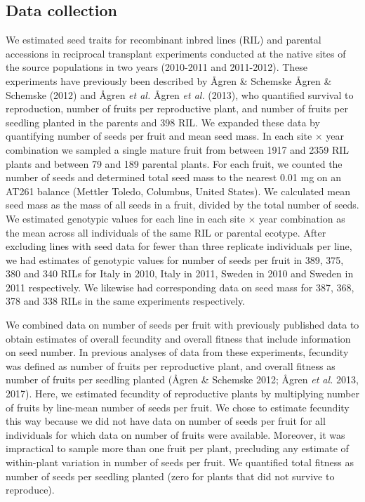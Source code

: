 \documentclass[12pt,]{article}
\begin{document}
\hypertarget{data-collection}{%
\subsection{Data collection}\label{data-collection}}

We estimated seed traits for recombinant inbred lines (RIL) and parental accessions in reciprocal transplant experiments conducted at the native sites of the source populations in two years (2010-2011 and 2011-2012). These experiments have previously been described by Ågren \& Schemske Ågren \& Schemske (2012) and Ågren \emph{et al.} Ågren \emph{et al.} (2013), who quantified survival to reproduction, number of fruits per reproductive plant, and number of fruits per seedling planted in the parents and 398 RIL. We expanded these data by quantifying number of seeds per fruit and mean seed mass. In each site × year combination we sampled a single mature fruit from between 1917 and 2359 RIL plants and between 79 and 189 parental plants.
For each fruit, we counted the number of seeds and determined total seed mass to the nearest 0.01 mg on an AT261 balance (Mettler Toledo, Columbus, United States). We calculated mean seed mass as the mass of all seeds in a fruit, divided by the total number of seeds. We estimated genotypic values for each line in each site × year combination as the mean across all individuals of the same RIL or parental ecotype. After excluding lines with seed data for fewer than three replicate individuals per line, we had estimates of genotypic values for number of seeds per fruit in 389, 375, 380 and 340 RILs for Italy in 2010, Italy in 2011, Sweden in 2010 and Sweden in 2011 respectively. We likewise had corresponding data on seed mass for 387, 368, 378 and 338 RILs in the same experiments respectively.

We combined data on number of seeds per fruit with previously published data to obtain estimates of overall fecundity and overall fitness that include information on seed number.
In previous analyses of data from these experiments, fecundity was defined as number of fruits per reproductive plant, and overall fitness as number of fruits per seedling planted (Ågren \& Schemske 2012; Ågren \emph{et al.} 2013, 2017).
Here, we estimated fecundity of reproductive plants by multiplying number of fruits by line-mean number of seeds per fruit.
We chose to estimate fecundity this way because we did not have data on number of seeds per fruit for all individuals for which data on number of fruits were available.
Moreover, it was impractical to sample more than one fruit per plant, precluding any estimate of within-plant variation in number of seeds per fruit.
We quantified total fitness as number of seeds per seedling planted (zero for plants that did not survive to reproduce).
\end{document}
